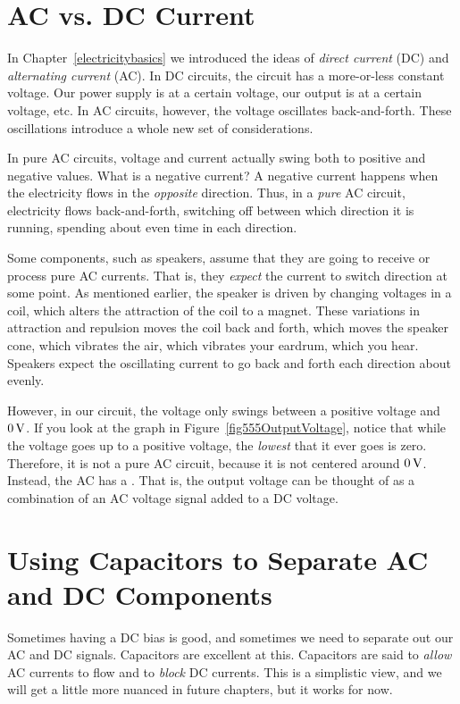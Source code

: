 \section{AC vs. DC Current}

In Chapter~\ref{electricitybasics} we introduced the ideas of \emph{direct current} (DC) and \emph{alternating current} (AC).  
In DC circuits, the circuit has a more-or-less constant voltage.
Our power supply is at a certain voltage, our output is at a certain voltage, etc.
In AC circuits, however, the voltage oscillates back-and-forth.
These oscillations introduce a whole new set of considerations.

In pure AC circuits, voltage and current actually swing both to positive and negative values.
What is a negative current?
A negative current happens when the electricity flows in the \emph{opposite} direction.
Thus, in a \emph{pure} AC circuit, electricity flows back-and-forth, switching off between which direction it is running, spending about even time in each direction.

Some components, such as speakers, assume that they are going to receive or process pure AC currents.
That is, they \emph{expect} the current to switch direction at some point.
As mentioned earlier, the speaker is driven by changing voltages in a coil, which alters the attraction of the coil to a magnet.
These variations in attraction and repulsion moves the coil back and forth, which moves the speaker cone, which vibrates the air, which vibrates your eardrum, which you hear.
Speakers expect the oscillating current to go back and forth each direction about evenly.

However, in our circuit, the voltage only swings between a positive voltage and $0\,\si{\volt}$.
If you look at the graph in Figure~\ref{fig555OutputVoltage}, notice that while the voltage goes up to a positive voltage, the \emph{lowest} that it ever goes is zero.
Therefore, it is not a pure AC circuit, because it is not centered around $0\,\si{\volt}$.
Instead, the AC has a . 
That is, the output voltage can be thought of as a combination of an AC voltage signal added to a DC voltage.


\section{Using Capacitors to Separate AC and DC Components}
\label{secCouplingCapacitor}

Sometimes having a DC bias is good, and sometimes we need to separate out our AC and DC signals.
Capacitors are excellent at this.  
Capacitors are said to \emph{allow} AC currents to flow and to \emph{block} DC currents.
This is a simplistic view, and we will get a little more nuanced in future chapters, but it works for now.


